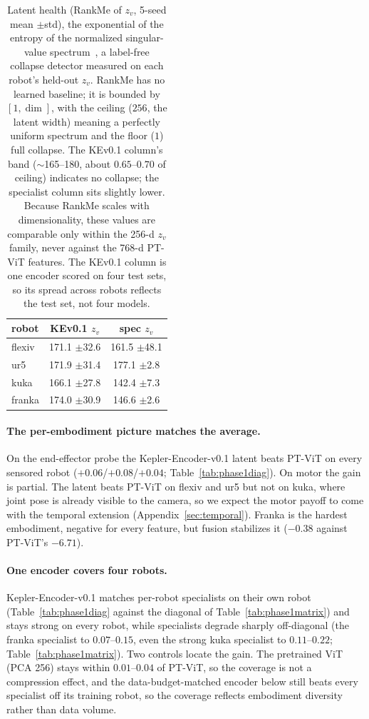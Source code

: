 \documentclass{article}
\begin{document}
\begin{table}[!htbp]
  \centering
  \caption{Latent health (RankMe of $z_v$, 5-seed mean $\pm$std), the exponential of the
  entropy of the normalized singular-value spectrum~\citep{rankme2023}, a label-free collapse detector measured on each robot's held-out $z_v$. RankMe has no learned baseline; it is bounded by $[1,\dim]$, with the ceiling ($256$, the latent width) meaning a perfectly uniform spectrum and the floor ($1$) full collapse. The KEv0.1 column's band ($\sim$165--180, about $0.65$--$0.70$ of ceiling) indicates no collapse; the specialist column sits slightly lower. Because RankMe scales with dimensionality, these values are comparable only within the 256-d $z_v$ family, never against the 768-d PT-ViT features. The KEv0.1 column is one encoder scored on four test sets, so its spread across robots reflects the test set, not four models.}
  \label{tab:phase1rankme}
  \begin{tabular}{lcc}
    \toprule
    robot & KEv0.1 $z_v$ & spec $z_v$ \\
    \midrule
    flexiv & 171.1 $\pm$32.6 & 161.5 $\pm$48.1 \\
    ur5    & 171.9 $\pm$31.4 & 177.1 $\pm$2.8 \\
    kuka   & 166.1 $\pm$27.8 & 142.4 $\pm$7.3 \\
    franka & 174.0 $\pm$30.9 & 146.6 $\pm$2.6 \\
    \bottomrule
  \end{tabular}
  \vspace{30pt}
\end{table}

\paragraph{The per-embodiment picture matches the average.} On the end-effector probe the Kepler-Encoder-v0.1 latent beats PT-ViT on every sensored robot ($+0.06$/$+0.08$/$+0.04$; Table~\ref{tab:phase1diag}). On motor the gain is partial. The latent beats PT-ViT on flexiv and ur5 but not on kuka, where joint pose is already visible to the camera, so we expect the motor payoff to come with the temporal extension (Appendix~\ref{sec:temporal}). Franka is the hardest embodiment, negative for every feature, but fusion stabilizes it ($-0.38$ against PT-ViT's $-6.71$).

\paragraph{One encoder covers four robots.} Kepler-Encoder-v0.1 matches per-robot specialists on their own robot (Table~\ref{tab:phase1diag} against the diagonal of Table~\ref{tab:phase1matrix}) and stays strong on every robot, while specialists degrade sharply off-diagonal (the franka specialist to $0.07$--$0.15$, even the strong kuka specialist to $0.11$--$0.22$; Table~\ref{tab:phase1matrix}). Two controls locate the gain. The pretrained ViT (PCA 256) stays within $0.01$--$0.04$ of PT-ViT, so the coverage is not a compression effect, and the data-budget-matched encoder below still beats every specialist off its training robot, so the coverage reflects embodiment diversity rather than data volume.
\end{document}
